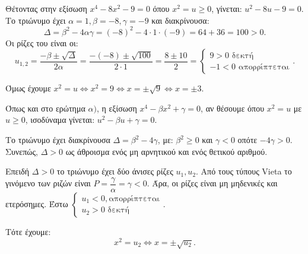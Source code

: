 
\begin{alist}
\item Θέτοντας στην εξίσωση $x^4 - 8x^2 - 9 = 0$ όπου $x^2 = u \ge 0$, γίνεται:
$u^2 - 8u - 9 = 0$.
Το τριώνυμο έχει $\alpha = 1, \beta = -8, \gamma = -9$ και διακρίνουσα:
\[\Delta = \beta^2 - 4\alpha\gamma = (-8)^2 - 4 \cdot 1 \cdot (-9) = 64 + 36 = 100 > 0.\]
Οι ρίζες του είναι οι:
\[u_{1,2} = \dfrac{-\beta \pm \sqrt{\Delta}}{2\alpha} = \dfrac{-(-8) \pm \sqrt{100}}{2 \cdot 1} = \dfrac{8 \pm 10}{2} = \begin{cases} 9 > 0 \text{ δεκτή} \\ -1 < 0 \text{ απορρίπτεται} \end{cases}.\]

Όμως έχουμε $x^2 = u \Leftrightarrow x^2 = 9 \Leftrightarrow x = \pm \sqrt{9} \Leftrightarrow x = \pm 3$.

\item Όπως και στο ερώτημα $\alpha)$, η εξίσωση $x^4 - \beta x^2 + \gamma = 0$, αν θέσουμε όπου $x^2 = u$ με
$u \ge 0$, ισοδύναμα γίνεται:
$u^2 - \beta u + \gamma = 0$.

\begin{rlist}
\item Το τριώνυμο έχει διακρίνουσα $\Delta = \beta^2 - 4\gamma$, με:
$\beta^2 \ge 0$ και
$\gamma < 0$ οπότε $-4\gamma > 0$.
Συνεπώς, $\Delta > 0$ ως άθροισμα ενός μη αρνητικού και ενός θετικού αριθμού.

\item Επειδή $\Delta > 0$ το τριώνυμο έχει δύο άνισες ρίζες $u_1, u_2$. Από τους τύπους Vieta το
γινόμενο των ριζών είναι $P = \dfrac{\gamma}{\alpha} = \gamma < 0$. Άρα, οι ρίζες είναι μη μηδενικές και
ετερόσημες. Έστω $\begin{cases} u_1 < 0, \text{απορρίπτεται} \\ u_2 > 0 \text{ δεκτή} \end{cases}$.

Τότε έχουμε:
\[x^2 = u_2 \Leftrightarrow x = \pm \sqrt{u_2}.\]
\end{rlist}
\end{alist}

